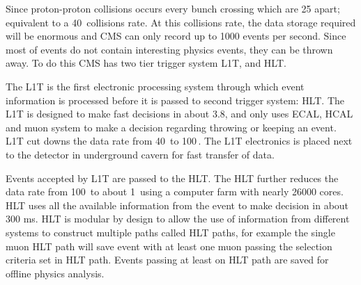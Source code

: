 Since proton-proton collisions occurs every bunch crossing which are
25\nanoseconds{} apart; equivalent to a 40\,\xspace collisions rate.
At this collisions rate, the data storage required will be enormous
and \gls{CMS} can only record up to 1000 events per second. Since most of events
do not contain interesting physics events, they can be thrown away.
To do this \gls{CMS} has two tier trigger system \gls{L1T}, and \gls{HLT}.

The \gls{L1T} is the first electronic processing system through
which event information is processed before it is passed to
second trigger system: \gls{HLT}.
The \gls{L1T} is designed to make fast decisions in about 3.8\mus,
and only uses \gls{ECAL}, \gls{HCAL} and muon system to make a decision
regarding throwing or keeping an event.
\gls{L1T} cut downs the data rate from 40\,\xspace to
100\,\xspace. The \gls{L1T} electronics is placed next to
the detector in underground cavern for fast transfer of data.

Events accepted by \gls{L1T} are passed to the \gls{HLT}.
The \gls{HLT} further reduces the data rate from 100\,\xspace to
about 1\,\xspace using a computer farm with nearly 26000 cores.
\gls{HLT} uses all the available information from the event to make
decision in about 300 ms. \gls{HLT} is modular by design
to allow the use of information from different systems to construct
multiple paths called \gls{HLT} paths, for example the single muon \gls{HLT}
path will save event with at least one muon passing the selection criteria
set in \gls{HLT} path. Events passing at least on \gls{HLT} path are
saved for offline physics analysis.
